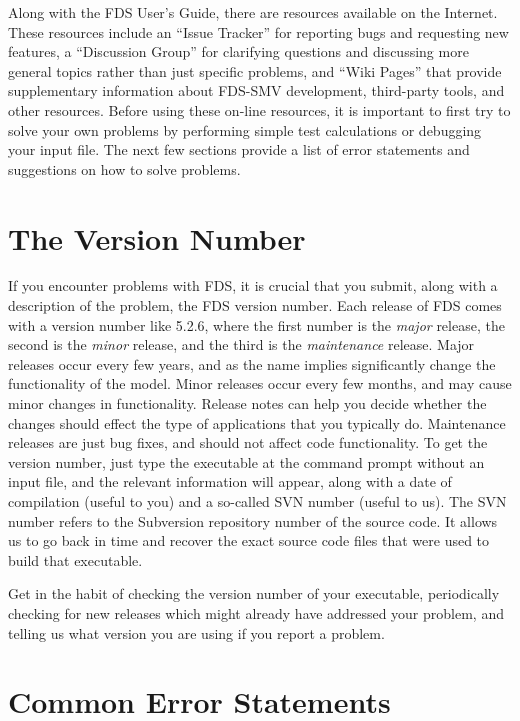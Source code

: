 \documentclass[11pt]{book}
\begin{document}
Along with the FDS User's Guide, there are resources available on the Internet.
These resources include an ``Issue Tracker'' for reporting bugs and requesting new features,
a ``Discussion Group'' for clarifying questions and discussing more general
topics rather than just specific problems, and ``Wiki Pages'' that provide supplementary information
about FDS-SMV development, third-party tools, and other resources.
Before using these on-line resources, it is important to first try to solve your own
problems by performing simple test calculations or debugging your input file. The next few sections
provide a list of error statements and suggestions on how to solve problems.

\section{The Version Number}

If you encounter problems with FDS, it is crucial that you submit, along with a description of the problem, the FDS version number. Each release of
FDS comes with a version number like 5.2.6, where the first number is the {\em major} release, the second is the {\em minor} release, and the
third is the {\em maintenance} release. Major releases occur every few years, and as the name implies significantly change the functionality of the model.
Minor releases occur every few months, and may cause minor changes in functionality. Release notes can help you decide whether the changes should effect the
type of applications that you typically do. Maintenance releases are just bug fixes, and should not affect code functionality. To get the version number, just
type the executable at the command prompt without an input file, and the relevant information will appear,
along with a date of compilation (useful to you) and a so-called SVN number (useful to us).  The SVN number refers to
the Subversion repository number of the source code. It allows us to go back in time and recover the exact source code files
that were used to build that executable.

Get in the habit of checking the version number of your executable, periodically checking for new releases which
might already have addressed your problem, and telling us what version you are using if you report a problem.





\section{Common Error Statements}
\label{info:Errors}
\end{document}
